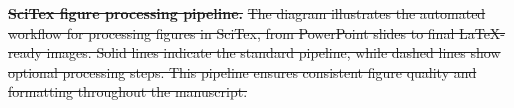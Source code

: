 \documentclass[preprint,review,12pt]{elsarticle}%
\providecommand{\DIFdeltex}[1]{{\protect\color{red}\sout{#1}}}                      %
\providecommand{\DIFdelFL}[1]{\DIFdel{#1}} %
\providecommand{\DIFdel}[1]{\texorpdfstring{\DIFdeltex{#1}}{}} %
\begin{document}
\begin{frontmatter}

{%
\textbf{\DIFdelFL{SciTex figure processing pipeline.}} %
\DIFdelFL{The diagram illustrates the automated workflow for processing figures in SciTex, from PowerPoint slides to final LaTeX-ready images. Solid lines indicate the standard pipeline, while dashed lines show optional processing steps. This pipeline ensures consistent figure quality and formatting throughout the manuscript.}}





\end{frontmatter}
\end{document}
